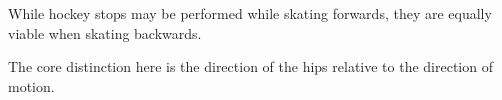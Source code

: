 
While hockey stops may be performed while skating forwards, they are equally viable when skating backwards.


The core distinction here is the direction of the hips relative to the direction of motion.


